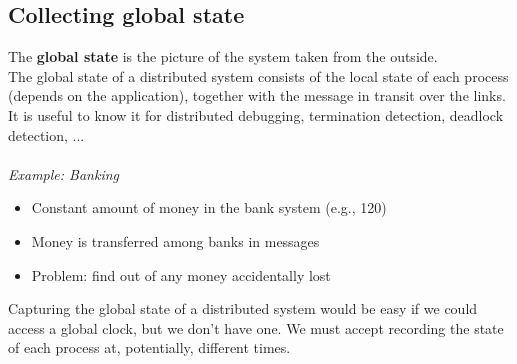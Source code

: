 \documentclass[10pt,a4paper]{article}
\begin{document}
\subsection{Collecting global state}
The \textbf{global state} is the picture of the system taken from the outside. \\
The global state of a distributed system consists of the local state of each process (depends on the application), together with the message in transit over the links. It is useful to know it for distributed debugging, termination detection, deadlock detection, ... \\ \\
\textit{Example: Banking} \\
\begin{itemize}
	\item Constant amount of money in the bank system (e.g., 120)
	\item Money is transferred among banks in messages
	\item Problem: find out of any money accidentally lost
\end{itemize}
Capturing the global state of a distributed system would be easy if we could access a global clock, but we don't have one. We must accept recording the state of each process at, potentially, different times.
\end{document}
